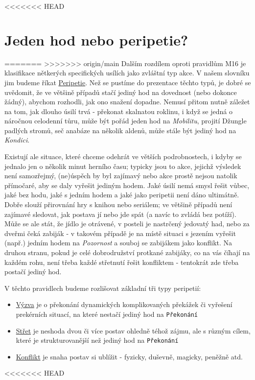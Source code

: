 \documentclass[../main.tex]{subfiles}
\begin{document}
<<<<<<< HEAD
\section{Jeden hod nebo peripetie?}
\label{sec:hod/peripetie}

=======
>>>>>>> origin/main
Dalším rozdílem oproti pravidlům M16 je klasifikace nětkerých specifických usílích jako zvláštní typ akce. V našem slovníku jim budeme říkat \underline{Peripetie}. Než se pustíme do prezentace těchto typů, je dobré se uvědomit, že ve většině případů stačí jediný hod na dovednost (nebo dokonce žádný), abychom rozhodli, jak ono snažení dopadne. Nemusí přitom nutně záležet na tom, jak dlouho úsilí trvá - překonat skalnatou roklinu, i když se jedná o náročnou celodenní tůru, může být pořád jeden hod na \textit{Mobilitu}, projití Džungle padlých stromů, seč anabáze na několik aldenů, může stále být jediný hod na \textit{Kondici}.

Existují ale situace, které chceme odehrát ve větších podrobnostech, i kdyby se jednalo jen o několik minut herního času; typicky jsou to akce, jejichž výsledek není samozřejmý, (ne)úspěch by byl zajímavý nebo akce prostě nejsou natolik přímočaré, aby se daly vyřešit jediným hodem. Jaké úsilí nemá smysl řešit vůbec, jaké bez hodu, jaké s jedním hodem a jaké jako peripetii není dáno ultimátně. Dobře slouží přirovnání hry s knihou nebo seriálem; ve většině případů není zajímavé sledovat, jak postava jí nebo jde spát (a navíc to zvládá bez potíží). Může se ale stát, že jídlo je otrávené, v posteli je nastrčený jedovatý had, nebo za dveřmi čeká zabiják - v takovém případě je na místě situaci s jezením vyřešit (např.) jedním hodem na \textit{Pozornost} a souboj se zabijákem jako konflikt. Na druhou stranu, pokud je celé dobrodružství protkané zabijáky, co na vás číhají na každém rohu, není třeba každé střetnutí řešit konfliktem - tentokrát zde třeba postačí jediný hod.

V těchto pravidlech budeme rozlišovat základní tři typy peripetií:

\begin{itemize}
\item \underline{Výzva} je o překonání dynamických komplikovaných překážek či vyřešení prekérních situací, na které nestačí jediný hod na \texttt{Překonání}
\item \underline{Střet} je neshoda dvou či více postav ohledně téhož zájmu, ale s různým cílem, které je strukturovanější než jediný hod na \texttt{Překonání}
\item \underline{Konflikt} je snaha postav si ublížit - fyzicky, duševně, magicky, peněžně atd.
\end{itemize}
<<<<<<< HEAD
\end{document}
